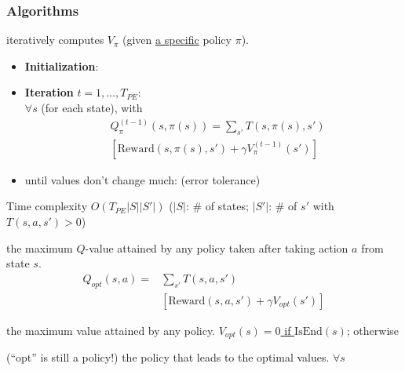 \subsubsection{Algorithms}

 iteratively computes $V_\pi$ (given \underline{a
specific} policy $\pi$).
\begin{itemize}
    \item \textbf{Initialization}: 
    \item \textbf{Iteration} $t = 1,\dots,T_{PE}$:\\
        $\forall s$ (for each state), 
        with \begin{displaymath}
            \boxed{
                \begin{aligned}
                    &Q_\pi^{(t-1)}(s,\pi(s)) = \sum_{s'}T(s,\pi(s),s')\\
                    &\left[\text{Reward}(s,\pi(s),s') + \gamma V_\pi^{(t-1)}(s')\right]
                \end{aligned}
            }
        \end{displaymath}
    \item until values don't change much: 
        (error tolerance)
\end{itemize}
Time complexity $O(T_{PE}|S||S'|)$ ($|S|$: \# of states; $|S'|$: \# of $s'$ with $T(s,a,s') > 0$)

 the maximum $Q$-value
attained by any policy taken after taking action $a$ from state $s$.
\begin{displaymath}
\boxed{
\begin{aligned}
    Q_{opt}(s,a) =& \sum_{s'}T(s,a,s')\\
    &\left[\text{Reward}(s,a,s') + \gamma V_{opt}(s')\right]
\end{aligned}
}
\end{displaymath}

 the maximum value attained by any policy.
\underline{$V_{opt}(s) = 0$ if $\text{IsEnd}(s)$};
otherwise 

 (``opt'' is still a policy!) the policy that leads
to the optimal values.
$\forall s$ 


